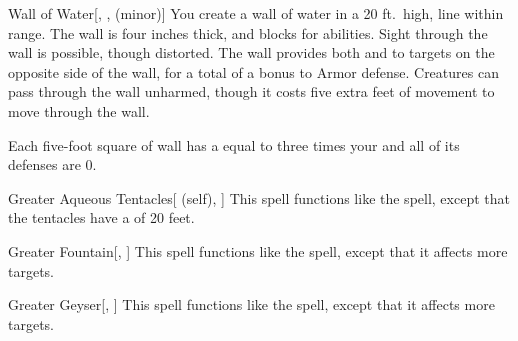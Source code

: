 \lowercase{\hypertarget{spell:Wall of Water}{}}\label{spell:Wall of Water}
\begin{freeability}[Rank 4]{\hypertarget{spell:Wall of Water}{Wall of Water}}[, ,  (minor)]
\targetrule
You create a wall of water in a 20 ft.\ high, \arealarge line within \rngmed range.
The wall is four inches thick, and blocks  for abilities.
Sight through the wall is possible, though distorted.
The wall provides both  and  to targets on the opposite side of the wall, for a total of a  bonus to Armor defense.
Creatures can pass through the wall unharmed, though it costs five extra feet of movement to move through the wall.

Each five-foot square of wall has a  equal to three times your  and all of its defenses are 0.
\end{freeability}
\vspace{0.25em}



\lowercase{\hypertarget{spell:Greater Aqueous Tentacles}{}}\label{spell:Greater Aqueous Tentacles}
\begin{attuneability}[Rank 5]{\hypertarget{spell:Greater Aqueous Tentacles}{Greater Aqueous Tentacles}}[ (self), ]
This spell functions like the  spell, except that the tentacles have a  of 20 feet.
\end{attuneability}
\vspace{0.25em}



\lowercase{\hypertarget{spell:Greater Fountain}{}}\label{spell:Greater Fountain}
\begin{freeability}[Rank 5]{\hypertarget{spell:Greater Fountain}{Greater Fountain}}[, ]
This spell functions like the  spell, except that it affects more targets.
\end{freeability}
\vspace{0.25em}



\lowercase{\hypertarget{spell:Greater Geyser}{}}\label{spell:Greater Geyser}
\begin{freeability}[Rank 5]{\hypertarget{spell:Greater Geyser}{Greater Geyser}}[, ]
This spell functions like the  spell, except that it affects more targets.
\end{freeability}
\vspace{0.25em}



